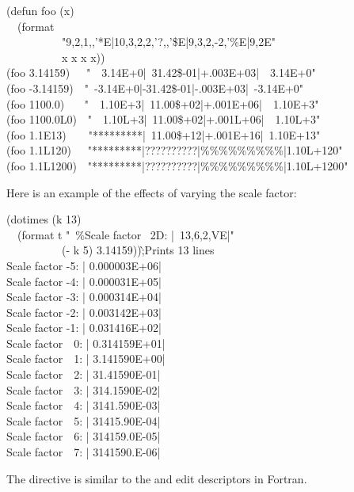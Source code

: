 \begin{flushdesc}
\begin{lisp}
(defun foo (x) \\
~~(format {\nil} \\
~~~~~~~~~~"{\Xtilde}9,2,1,,'*E|{\Xtilde}10,3,2,2,'?,,'\$E|{\Xtilde}9,3,2,-2,'\%{\Xatsign}E|{\Xtilde}9,2E" \\
~~~~~~~~~~x x x x)) \\
(foo 3.14159)~~\EV\ "~~3.14E+0|~31.42\$-01|+.003E+03|~~3.14E+0" \\
(foo -3.14159)~\EV\ "~-3.14E+0|-31.42\$-01|-.003E+03|~-3.14E+0" \\
(foo 1100.0) ~~\EV\ "~~1.10E+3|~11.00\$+02|+.001E+06|~~1.10E+3" \\
(foo 1100.0L0)~\EV\ "~~1.10L+3|~11.00\$+02|+.001L+06|~~1.10L+3" \\
(foo 1.1E13)~~~\EV\ "*********|~11.00\$+12|+.001E+16|~1.10E+13" \\
(foo 1.1L120)~~\EV\ "*********|??????????|\%\%\%\%\%\%\%\%\%|1.10L+120" \\
(foo 1.1L1200)~\EV\ "*********|??????????|\%\%\%\%\%\%\%\%\%|1.10L+1200"
\end{lisp}
Here is an example of the effects of varying the scale factor:
\begin{lisp}
(dotimes (k 13) \\
~~(format t "~\%Scale factor ~2D: |~13,6,2,VE|" \\
~~~~~~~~~~(- k 5) 3.14159))\`;{\rm Prints 13 lines} \\
Scale factor -5: | 0.000003E+06| \\
Scale factor -4: | 0.000031E+05| \\
Scale factor -3: | 0.000314E+04| \\
Scale factor -2: | 0.003142E+03| \\
Scale factor -1: | 0.031416E+02| \\
Scale factor~~0: | 0.314159E+01| \\
Scale factor~~1: | 3.141590E+00| \\
Scale factor~~2: | 31.41590E-01| \\
Scale factor~~3: | 314.1590E-02| \\
Scale factor~~4: | 3141.590E-03| \\
Scale factor~~5: | 31415.90E-04| \\
Scale factor~~6: | 314159.0E-05| \\
Scale factor~~7: | 3141590.E-06|
\end{lisp}

\beforenoterule
\begin{incompatibility}
The  directive is similar to the
 and 
edit descriptors in Fortran.


\end{incompatibility}
\end{flushdesc}

